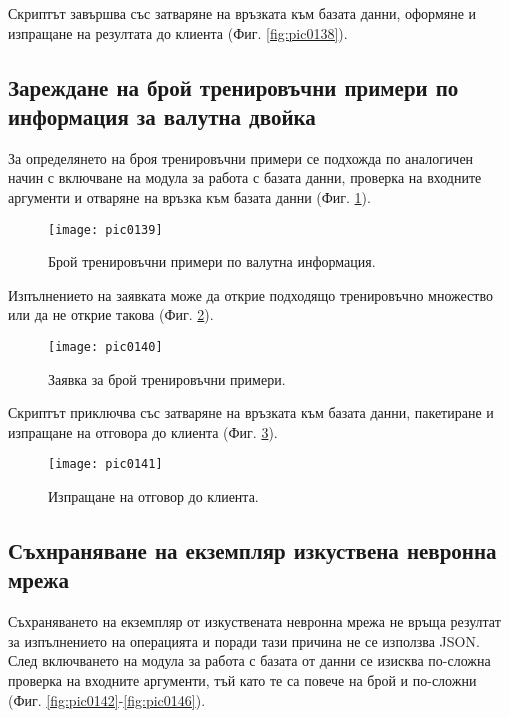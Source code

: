 Скриптът завършва със затваряне на връзката към базата данни, оформяне и изпращане на резултата до клиента (Фиг. \ref{fig:pic0138}).

\subsection{Зареждане на брой тренировъчни примери по информация за валутна двойка}

За определянето на броя тренировъчни примери се подхожда по аналогичен начин с включване на модула за работа с базата данни, проверка на входните аргументи и отваряне на връзка към базата данни (Фиг. \ref{fig:pic0139}). 

\begin{figure}[h]
  \centering
  \texttt{[image: pic0139]}
  \caption{Брой тренировъчни примери по валутна информация.}
\label{fig:pic0139}
\end{figure}
\FloatBarrier

Изпълнението на заявката може да открие подходящо тренировъчно множество или да не открие такова (Фиг. \ref{fig:pic0140}). 

\begin{figure}[h]
  \centering
  \texttt{[image: pic0140]}
  \caption{Заявка за брой тренировъчни примери.}
\label{fig:pic0140}
\end{figure}
\FloatBarrier

Скриптът приключва със затваряне на връзката към базата данни, пакетиране и изпращане на отговора до клиента (Фиг. \ref{fig:pic0141}).

\begin{figure}[h]
  \centering
  \texttt{[image: pic0141]}
  \caption{Изпращане на отговор до клиента.}
\label{fig:pic0141}
\end{figure}
\FloatBarrier

\subsection{Съхнраняване на екземпляр изкуствена невронна мрежа}

Съхраняването на екземпляр от изкуствената невронна мрежа не връща резултат за изпълнението на операцията и поради тази причина не се използва JSON. След включването на модула за работа с базата от данни се изисква по-сложна проверка на входните аргументи, тъй като те са повече на брой и по-сложни (Фиг. \ref{fig:pic0142}-\ref{fig:pic0146}). 

